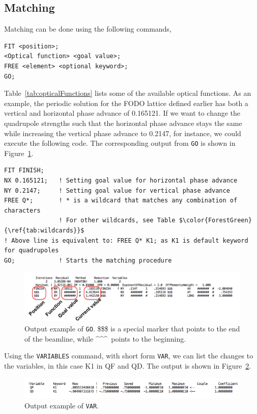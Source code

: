 \documentclass{article}
\begin{document}
\subsection{Matching}
Matching can be done using the following commands,
\begin{lstlisting}
FIT <position>;
<Optical function> <goal value>;
FREE <element> <optional keyword>;
GO;
\end{lstlisting}
Table~\ref{tab:opticalFunctions} lists some of the available optical functions.
%
As an example, the periodic solution for the FODO lattice defined earlier has both a vertical and horizontal phase advance of 0.165121. If we want to change the quadrupole strengths such that the horizontal phase advance stays the same while increasing the vertical phase advance to 0.2147, for instance, we could execute the following code. The corresponding output from \texttt{GO} is shown in Figure~\ref{fig:goExample}.
%
\begin{lstlisting}[mathescape=true]
FIT FINISH;
NX 0.165121;   ! Setting goal value for horizontal phase advance
NY 0.2147;     ! Setting goal value for vertical phase advance
FREE Q*;       ! * is a wildcard that matches any combination of characters
               ! For other wildcards, see Table $\color{ForestGreen}{\ref{tab:wildcards}}$
! Above line is equivalent to: FREE Q* K1; as K1 is default keyword for quadrupoles
GO;            ! Starts the matching procedure
\end{lstlisting}
%
\begin{figure}[h]
	\begin{center}
	\includegraphics[width=1\columnwidth]{figures/goOutputExampleFODO.png}
	\end{center}
	\caption{Output example of \texttt{GO}. \$\$\$ is a special marker that points to the end of the beamline, while \textasciicircum \textasciicircum \textasciicircum \ points to the beginning.}
	\label{fig:goExample}
\end{figure}
%
Using the \texttt{VARIABLES} command, with short form \texttt{VAR}, we can list the changes to the variables, in this case K1 in QF and QD. The output is shown in Figure~\ref{fig:varExample}.
%
\begin{figure}[h]
	\begin{center}
	\includegraphics[width=1\columnwidth]{figures/varOutputExampleFODO.png}
	\end{center}
	\caption{Output example of \texttt{VAR}.}
	\label{fig:varExample}
\end{figure}
\end{document}
